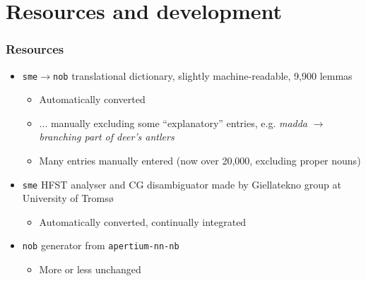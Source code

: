 \documentclass[notes=hide]{beamer}
\newcommand{\sme}{{\tt sme}}
\newcommand{\nob}{{\tt nob}}
\newcommand{\smenob}{\sme$\rightarrow{}$\nob}
\begin{document}
\section{Resources and development}
\begin{frame}
  \frametitle{Resources}
  \begin{itemize}
  \item \smenob{} translational dictionary, slightly machine-readable,
    9,900 lemmas
    \begin{itemize}
    \item Automatically converted
    \item ... manually excluding some
      ``explanatory'' entries, e.g. \textit{madda} $\rightarrow$
      \textit{branching part of deer's antlers}
    \item Many entries manually entered (now over 20,000, excluding
      proper nouns)
    \end{itemize}
  \end{itemize}
  \begin{itemize}
  \item \sme{} HFST analyser and CG disambiguator made by Giellatekno group
    at University of Tromsø
    \begin{itemize}
    \item Automatically converted, continually integrated
    \end{itemize}
  \end{itemize}
  \begin{itemize}
  \item \nob{} generator from \texttt{apertium-nn-nb}
    \begin{itemize}
    \item More or less unchanged
    \end{itemize}
  \end{itemize}
\end{frame}
\end{document}
